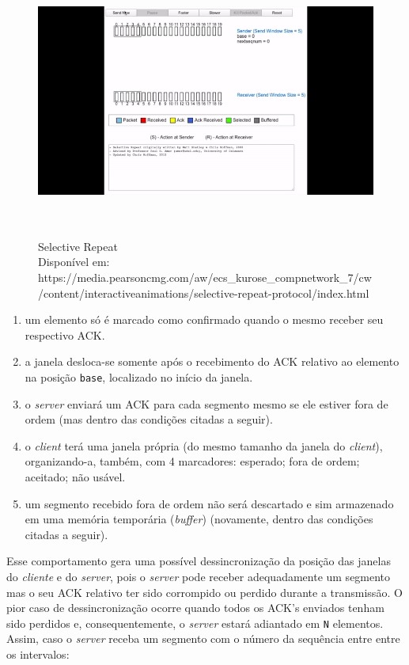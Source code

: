 \begin{figure}[h!]
\centering
\includegraphics[keepaspectratio, width=12cm, height=9cm]{imagens/12/12 - animation of selective repeat.png}
\caption{Selective Repeat \\
Disponível em:
https://media.pearsoncmg.com/aw/ecs\_kurose\_compnetwork\_7/cw/content/interactiveanimations/selective-repeat-protocol/index.html \\}
\label{Selective Repeat}
\end{figure}



\begin{enumerate}
\def\labelenumi{\arabic{enumi}.}
\tightlist
\item
  um elemento só é marcado como confirmado quando o mesmo receber seu
  respectivo ACK.
\item
  a janela desloca-se somente após o recebimento do ACK relativo ao
  elemento na posição \texttt{base}, localizado no início da janela.
\item
  o \emph{server} enviará um ACK para cada segmento mesmo se ele estiver
  fora de ordem (mas dentro das condições citadas a seguir).
\item
  o \emph{client} terá uma janela própria (do mesmo tamanho da janela do
  \emph{client}), organizando-a, também, com 4 marcadores: esperado;
  fora de ordem; aceitado; não usável.
\item
  um segmento recebido fora de ordem não será descartado e sim
  armazenado em uma memória temporária (\emph{buffer}) (novamente,
  dentro das condições citadas a seguir).
\end{enumerate}

Esse comportamento gera uma possível dessincronização da posição das
janelas do \emph{cliente} e do \emph{server}, pois o \emph{server} pode
receber adequadamente um segmento mas o seu ACK relativo ter sido
corrompido ou perdido durante a transmissão. O pior caso de
dessincronização ocorre quando todos os ACK's enviados tenham sido
perdidos e, consequentemente, o \emph{server} estará adiantado em
\texttt{N} elementos. Assim, caso o \emph{server} receba um segmento com
o número da sequência entre entre os intervalos:



